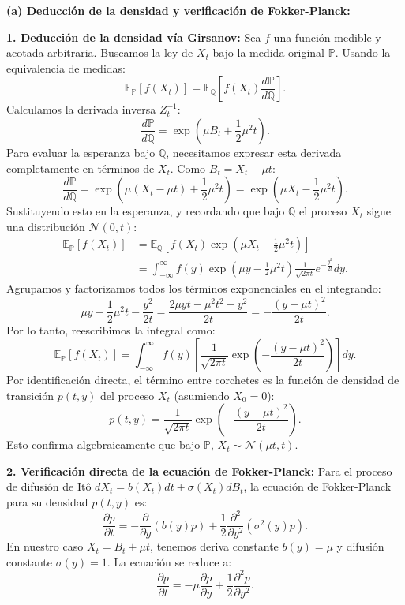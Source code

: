 \documentclass[11pt, letterpaper]{article}
\begin{document}
\begin{solucion}
    \vspace{3mm}
    \textbf{(a) Deducción de la densidad y verificación de Fokker-Planck:}

    \textbf{1. Deducción de la densidad vía Girsanov:}
    Sea $f$ una función medible y acotada arbitraria. Buscamos la ley de $X_t$ bajo la medida original $\mathbb{P}$. Usando la equivalencia de medidas:
    \[ \mathbb{E}_{\mathbb{P}}[f(X_t)] = \mathbb{E}_{\mathbb{Q}}\left[ f(X_t) \frac{d\mathbb{P}}{d\mathbb{Q}} \right]. \]
    Calculamos la derivada inversa $Z_t^{-1}$:
    \[ \frac{d\mathbb{P}}{d\mathbb{Q}} = \exp\left( \mu B_t + \frac{1}{2}\mu^2 t \right). \]
    Para evaluar la esperanza bajo $\mathbb{Q}$, necesitamos expresar esta derivada completamente en términos de $X_t$. Como $B_t = X_t - \mu t$:
    \[ \frac{d\mathbb{P}}{d\mathbb{Q}} = \exp\left( \mu(X_t - \mu t) + \frac{1}{2}\mu^2 t \right) = \exp\left( \mu X_t - \frac{1}{2}\mu^2 t \right). \]
    Sustituyendo esto en la esperanza, y recordando que bajo $\mathbb{Q}$ el proceso $X_t$ sigue una distribución $\mathcal{N}(0, t)$:
    \begin{align*}
        \mathbb{E}_{\mathbb{P}}[f(X_t)] &= \mathbb{E}_{\mathbb{Q}}\left[ f(X_t) \exp\left( \mu X_t - \frac{1}{2}\mu^2 t \right) \right] \\
        &= \int_{-\infty}^{\infty} f(y) \exp\left( \mu y - \frac{1}{2}\mu^2 t \right) \frac{1}{\sqrt{2\pi t}} e^{-\frac{y^2}{2t}} dy.
    \end{align*}
    Agrupamos y factorizamos todos los términos exponenciales en el integrando:
    \[ \mu y - \frac{1}{2}\mu^2 t - \frac{y^2}{2t} = \frac{2\mu y t - \mu^2 t^2 - y^2}{2t} = -\frac{(y - \mu t)^2}{2t}. \]
    Por lo tanto, reescribimos la integral como:
    \[ \mathbb{E}_{\mathbb{P}}[f(X_t)] = \int_{-\infty}^{\infty} f(y) \left[ \frac{1}{\sqrt{2\pi t}} \exp\left( -\frac{(y - \mu t)^2}{2t} \right) \right] dy. \]
    Por identificación directa, el término entre corchetes es la función de densidad de transición $p(t, y)$ del proceso $X_t$ (asumiendo $X_0 = 0$):
    \[ p(t, y) = \frac{1}{\sqrt{2\pi t}} \exp\left( -\frac{(y - \mu t)^2}{2t} \right). \]
    Esto confirma algebraicamente que bajo $\mathbb{P}$, $X_t \sim \mathcal{N}(\mu t, t)$.

    \textbf{2. Verificación directa de la ecuación de Fokker-Planck:}
    Para el proceso de difusión de Itô $dX_t = b(X_t)dt + \sigma(X_t)dB_t$, la ecuación de Fokker-Planck para su densidad $p(t, y)$ es:
    \[ \frac{\partial p}{\partial t} = -\frac{\partial}{\partial y}(b(y)p) + \frac{1}{2}\frac{\partial^2}{\partial y^2}(\sigma^2(y)p). \]
    En nuestro caso $X_t = B_t + \mu t$, tenemos deriva constante $b(y) = \mu$ y difusión constante $\sigma(y) = 1$. La ecuación se reduce a:
    \[ \frac{\partial p}{\partial t} = -\mu \frac{\partial p}{\partial y} + \frac{1}{2} \frac{\partial^2 p}{\partial y^2}. \]
    

\end{solucion}
\end{document}
